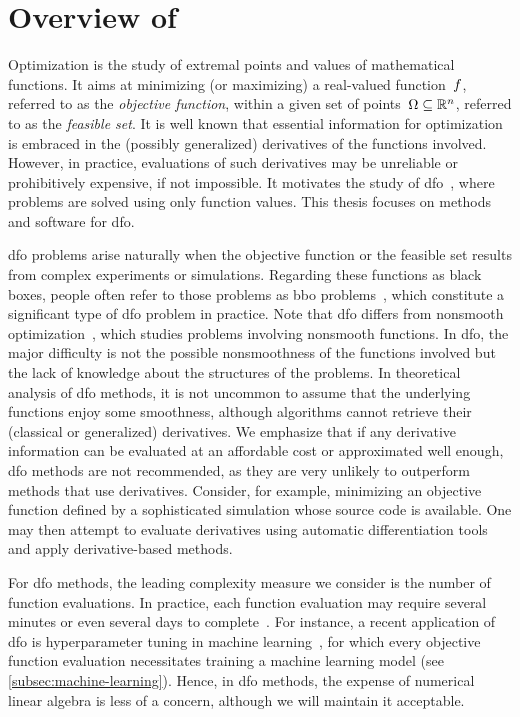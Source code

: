\section{Overview of }
\label{sec:overview}

Optimization is the study of extremal points and values of mathematical functions.
It aims at minimizing (or maximizing) a real-valued function~$f$, referred to as the \emph{objective function}, within a given set of points~$\Omega \subseteq \mathbb{R}^n$, referred to as the \emph{feasible set}.
It is well known that essential information for optimization is embraced in the (possibly generalized) derivatives of the functions involved.
However, in practice, evaluations of such derivatives may be unreliable or prohibitively expensive, if not impossible.
It motivates the study of \gls{dfo}~\cite{Conn_Scheinberg_Vicente_2009b,Audet_Hare_2017,Custodio_Scheinberg_Vicente_2017,Larson_Menickelly_Wild_2019}, where problems are solved using only function values.
This thesis focuses on methods and software for \gls{dfo}.

\Gls{dfo} problems arise naturally when the objective function or the feasible set results from complex experiments or simulations.
Regarding these functions as black boxes, people often refer to those problems as \gls{bbo} problems~\cite{Audet_Hare_2017}, which constitute a significant type of \gls{dfo} problem in practice.
Note that \gls{dfo} differs from nonsmooth optimization~\cite{Clark_1983,Cui_Pang_2021}, which studies problems involving nonsmooth functions.
In \gls{dfo}, the major difficulty is not the possible nonsmoothness of the functions involved but the lack of knowledge about the structures of the problems.
In theoretical analysis of \gls{dfo} methods, it is not uncommon to assume that the underlying functions enjoy some smoothness, although algorithms cannot retrieve their (classical or generalized) derivatives.
We emphasize that if any derivative information can be evaluated at an affordable cost or approximated well enough, \gls{dfo} methods are not recommended, as they are very unlikely to outperform methods that use derivatives.
Consider, for example, minimizing an objective function defined by a sophisticated simulation whose source code is available.
One may then attempt to evaluate derivatives using automatic differentiation tools~\cite{Griewank_2003,Griewank_Walther_2008} and apply derivative-based methods.

For \gls{dfo} methods, the leading complexity measure we consider is the number of function evaluations.
In practice, each function evaluation may require several minutes or even several days to complete~\cite[\S~1.4]{Audet_Hare_2017}.
For instance, a recent application of \gls{dfo} is hyperparameter tuning in machine learning~\cite{Ghanbari_Scheinberg_2017}, for which every objective function evaluation necessitates training a machine learning model (see \cref{subsec:machine-learning}).
Hence, in \gls{dfo} methods, the expense of numerical linear algebra is less of a concern, although we will maintain it acceptable.

